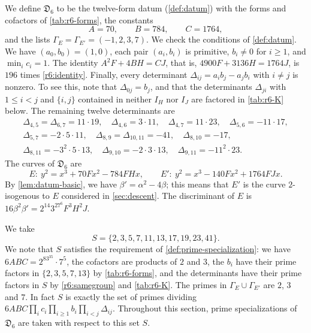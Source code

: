 \documentclass[12pt,oneside,openany]{book}
\theoremstyle{definition}
\theoremstyle{plain}
\numberwithin{equation}{chapter}
\theoremstyle{plain}
\theoremstyle{definition}
\theoremstyle{remark}
\newcommand{\datum}{\mathfrak D}
\begin{document}
We define $\datum_6$ to be the twelve-form datum (\cref{def:datum}) with the forms and cofactors of \cref{tab:r6-forms}, the constants
\[
A=70,\qquad B=784,\qquad C=1764,
\]
and the lists $\Gamma_E=\Gamma_{E'}=(-1,2,3,7)$. We check the conditions of \cref{def:datum}. We have $(a_0,b_0)=(1,0)$, each pair $(a_i,b_i)$ is primitive, $b_i\ne0$ for $i\ge1$, and $\min_ic_i=1$. The identity $A^2F+4BH=CJ$, that is, $4900F+3136H=1764J$, is $196$ times \eqref{r6:identity}. Finally, every determinant $\Delta_{ij}=a_ib_j-a_jb_i$ with $i\ne j$ is nonzero. To see this, note that $\Delta_{0j}=b_j$, and that the determinants $\Delta_{ji}$ with $1\le i<j$ and $\{i,j\}$ contained in neither $I_H$ nor $I_J$ are factored in \cref{tab:r6-K} below. The remaining twelve determinants are
\begin{equation}\label{r6:samegroup}
\begin{gathered}
\Delta_{4,5}=\Delta_{6,7}=11\cdot19,\quad \Delta_{4,6}=3\cdot11,\quad \Delta_{4,7}=11\cdot23,\quad \Delta_{5,6}=-11\cdot17,\\
\Delta_{5,7}=-2\cdot5\cdot11,\quad \Delta_{8,9}=\Delta_{10,11}=-41,\quad \Delta_{8,10}=-17,\\
\Delta_{8,11}=-3^{2}\cdot5\cdot13,\quad \Delta_{9,10}=-2\cdot3\cdot13,\quad \Delta_{9,11}=-11^{2}\cdot23.
\end{gathered}
\end{equation}
The curves of $\datum_6$ are
\begin{equation}\label{r6:curves}
E:\ y^2=x^3+70Fx^2-784FHx,\qquad E':\ y^2=x^3-140Fx^2+1764FJx.
\end{equation}
By \cref{lem:datum-basic}, we have $\beta'=\alpha^2-4\beta$; this means that $E'$ is the curve $2$-isogenous to $E$ considered in \cref{sec:descent}. The discriminant of $E$ is $16\beta^2\beta'=2^{14}3^27^6F^3H^2J$.

We take
\begin{equation}\label{r6:S}
S=\{2,3,5,7,11,13,17,19,23,41\}.
\end{equation}
We note that $S$ satisfies the requirement of \cref{def:prime-specialization}: we have $6ABC=2^83^35\cdot7^5$, the cofactors are products of $2$ and $3$, the $b_i$ have their prime factors in $\{2,3,5,7,13\}$ by \cref{tab:r6-forms}, and the determinants have their prime factors in $S$ by \eqref{r6:samegroup} and \cref{tab:r6-K}. The primes in $\Gamma_E\cup\Gamma_{E'}$ are $2$, $3$ and $7$. In fact $S$ is exactly the set of primes dividing $6ABC\prod_ic_i\prod_{i\ge1}b_i\prod_{i<j}\Delta_{ij}$. Throughout this section, prime specializations of $\datum_6$ are taken with respect to this set $S$.
\end{document}
